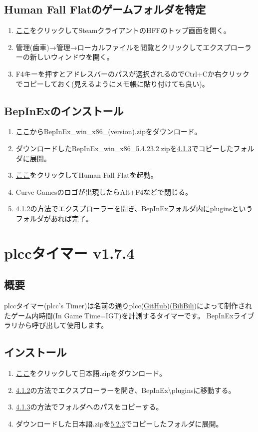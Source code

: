 \documentclass[lualatex,a4paper,fontsize=11pt,jafontscale=0.9247,titlepage,oneside]{jlreq}
\begin{document}
\subsection{Human Fall Flatのゲームフォルダを特定}
\begin{enumerate}
\item \href{steam://open/games/details/477160}{ここ}をクリックしてSteamクライアントのHFFのトップ画面を開く。
\item \label{4.1.2}管理(歯車)→管理→ローカルファイルを閲覧とクリックしてエクスプローラーの新しいウィンドウを開く。
\item \label{4.1.3}F4キーを押すとアドレスバーのパスが選択されるのでCtrl+Cか右クリックでコピーしておく(見えるようにメモ帳に貼り付けても良い)。
\end{enumerate}
\subsection{BepInExのインストール}
\begin{enumerate}
\item \href{https://github.com/BepInEx/BepInEx/releases/latest}{ここ}からBepInEx\_win\_x86\_(version).zipをダウンロード。
\item ダウンロードしたBepInEx\_win\_x86\_5.4.23.2.zipを\hyperref[4.1.3]{4.1.3}でコピーしたフォルダに展開。
\item \href{steam://rungameid/477160}{ここ}をクリックしてHuman Fall Flatを起動。
\item Curve Gamesのロゴが出現したらAlt+F4などで閉じる。
\item \hyperref[4.1.2]{4.1.2}の方法でエクスプローラーを開き、BepInExフォルダ内にpluginsというフォルダがあれば完了。
\end{enumerate}
\section{plccタイマー v1.7.4}
\subsection{概要}
plccタイマー(plcc's Timer)は名前の通りplcc(\href{https://github.com/plcc0}{GitHub})(\href{https://space.bilibili.com/111277972}{BiliBili})によって制作されたゲーム内時間(In Game Time=IGT)を計測するタイマーです。\parr
BepInExライブラリから呼び出して使用します。
\subsection{インストール}
\begin{enumerate}   
\item \href{https://github.com/Msgame79/hffmods/raw/refs/heads/main/plcc's%20timer/1.7.4/%E6%97%A5%E6%9C%AC%E8%AA%9E.zip}{ここ}をクリックして日本語.zipをダウンロード。
\item \hyperref[4.1.2]{4.1.2}の方法でエクスプローラーを開き、BepInEx\textbackslash pluginsに移動する。
\item \label{5.2.3}\hyperref[4.1.3]{4.1.3}の方法でフォルダへのパスをコピーする。
\item ダウンロードした日本語.zipを\hyperref[5.2.3]{5.2.3}でコピーしたフォルダに展開。
\end{enumerate}
\end{document}
